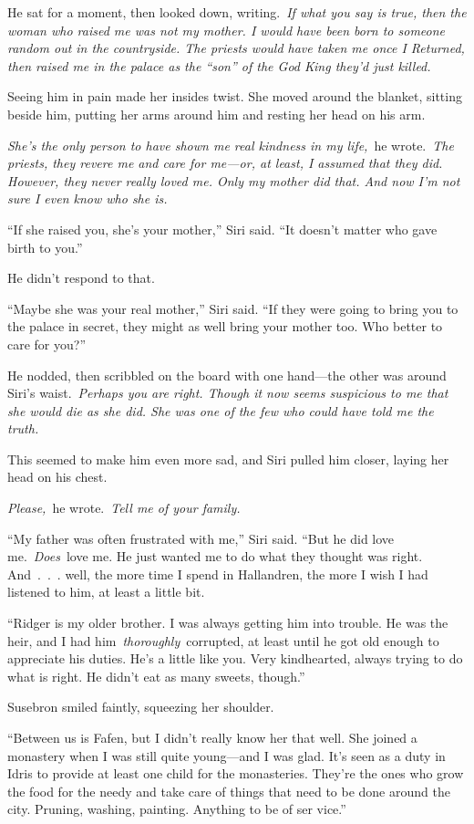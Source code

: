 He sat for a moment, then looked down, writing.~\textit{If what you say is true, then the woman who raised me was not my mother. I would have been born to someone random out in the countryside. The priests would have taken me once I Returned, then raised me in the palace as the “son” of the God King they’d just killed.}

Seeing him in pain made her insides twist. She moved around the blanket, sitting beside him, putting her arms around him and resting her head on his arm.

\textit{She’s the only person to have shown me real kindness in my life,}~he wrote.~\textit{The priests, they revere me and care for me—or, at least, I assumed that they did. However, they never really loved me. Only my mother did that. And now I’m not sure I even know who she is.}

“If she raised you, she’s your mother,” Siri said. “It doesn’t matter who gave birth to you.”

He didn’t respond to that.

“Maybe she was your real mother,” Siri said. “If they were going to bring you to the palace in secret, they might as well bring your mother too. Who better to care for you?”

He nodded, then scribbled on the board with one hand—the other was around Siri’s waist.~\textit{Perhaps you are right. Though it now seems suspicious to me that she would die as she did. She was one of the few who could have told me the truth.}

This seemed to make him even more sad, and Siri pulled him closer, laying her head on his chest.

\textit{Please,}~he wrote.~\textit{Tell me of your family.}

“My father was often frustrated with me,” Siri said. “But he did love me.~\textit{Does}~love me. He just wanted me to do what they thought was right. And~.~.~. well, the more time I spend in Hallandren, the more I wish I had listened to him, at least a little bit.

“Ridger is my older brother. I was always getting him into trouble. He was the heir, and I had him~\textit{thoroughly}~corrupted, at least until he got old enough to appreciate his duties. He’s a little like you. Very kindhearted, always trying to do what is right. He didn’t eat as many sweets, though.”

Susebron smiled faintly, squeezing her shoulder.

“Between us is Fafen, but I didn’t really know her that well. She joined a monastery when I was still quite young—and I was glad. It’s seen as a duty in Idris to provide at least one child for the monasteries. They’re the ones who grow the food for the needy and take care of things that need to be done around the city. Pruning, washing, painting. Anything to be of ser vice.”


